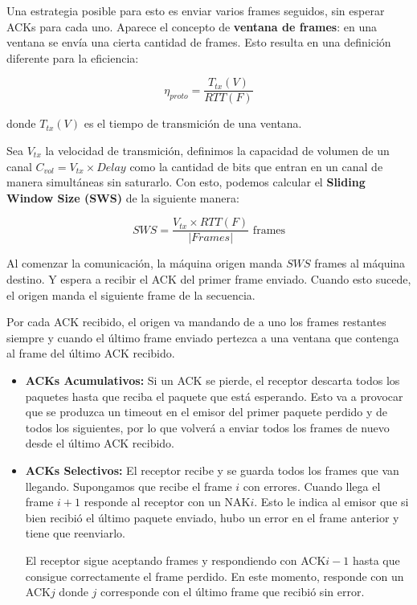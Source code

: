 Una estrategia posible para esto es enviar varios frames seguidos, sin esperar ACKs para cada uno.
Aparece el concepto de \textbf{ventana de frames}: en una ventana se envía una cierta cantidad de frames. Esto resulta en una definición diferente para la eficiencia:

\[\eta_{proto} = \frac{T_{tx}(V)}{RTT(F)}\]

donde \(T_{tx}(V)\) es el tiempo de transmición de una ventana.

Sea \(V_{tx}\) la velocidad de transmición, definimos la capacidad de volumen de un canal \(C_{vol} = V_{tx}\times Delay\) como la cantidad de bits que entran en un canal de manera simultáneas sin saturarlo. Con esto, podemos calcular el \textbf{Sliding Window Size (SWS)} de la siguiente manera:

\[SWS = \frac{V_{tx}\times RTT(F)}{|Frames|} \text{ frames}\]

Al comenzar la comunicación, la máquina origen manda \(SWS\) frames al máquina destino. Y espera a recibir el ACK del primer frame enviado. Cuando esto sucede, el origen manda el siguiente frame de la secuencia.

Por cada ACK recibido, el origen va mandando de a uno los frames restantes siempre y cuando el último frame enviado pertezca a una ventana que contenga al frame del último ACK recibido.

\begin{itemize}
  \item \textbf{ACKs Acumulativos:} Si un ACK se pierde, el receptor descarta todos los paquetes hasta que reciba el paquete que está esperando. Esto va a provocar que se produzca un timeout en el emisor del primer paquete perdido y de todos los siguientes, por lo que volverá a enviar todos los frames de nuevo desde el último ACK recibido.
  \item \textbf{ACKs Selectivos:} El receptor recibe y se guarda todos los frames que van llegando. Supongamos que recibe el frame \(i\) con errores. Cuando llega el frame \(i + 1\) responde al receptor con un NAK\(i\). Esto le indica al emisor que si bien recibió el último paquete enviado, hubo un error en el frame anterior y tiene que reenviarlo.
  
  El receptor sigue aceptando frames y respondiendo con ACK\(i-1\) hasta que consigue correctamente el frame perdido. En este momento, responde con un ACK\(j\) donde \(j\) corresponde con el último frame que recibió sin error.
\end{itemize}

